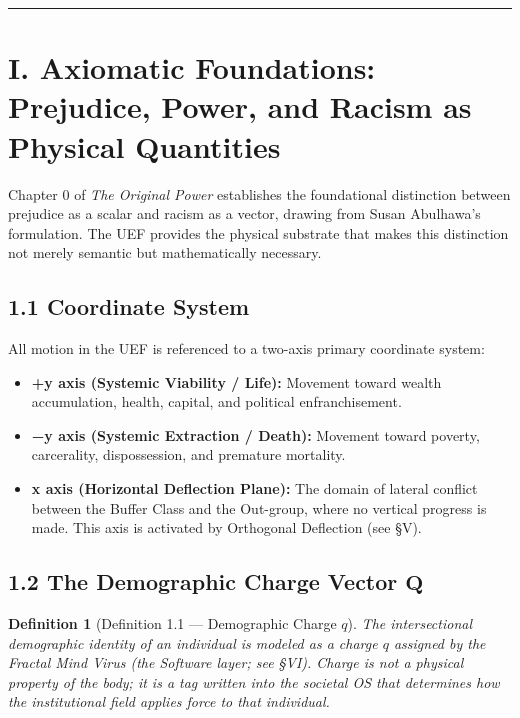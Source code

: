 \documentclass[12pt]{book}
\numberwithin{equation}{chapter}
\newtheorem{definition}{Definition}[chapter]
\begin{document}
\bigskip
\hrule
\bigskip

\section{I. Axiomatic Foundations: Prejudice, Power, and Racism as Physical Quantities}

    Chapter 0 of \emph{The Original Power} establishes the foundational distinction between prejudice as a scalar and racism as a vector, drawing from Susan Abulhawa's formulation. The UEF provides the physical substrate that makes this distinction not merely semantic but mathematically necessary.
  

\subsection{1.1 Coordinate System}

    All motion in the UEF is referenced to a two-axis primary coordinate system:
  

\begin{itemize}

\item \textbf{+y axis (Systemic Viability / Life):} Movement toward wealth accumulation, health, capital, and political enfranchisement.

\item \textbf{−y axis (Systemic Extraction / Death):} Movement toward poverty, carcerality, dispossession, and premature mortality.

\item \textbf{x axis (Horizontal Deflection Plane):} The domain of lateral conflict between the Buffer Class and the Out-group, where no vertical progress is made. This axis is activated by Orthogonal Deflection (see §V).

\end{itemize}

\subsection{1.2 The Demographic Charge Vector $\mathbf{Q}$}

\begin{definition}[Definition 1.1 — Demographic Charge $q$]
The intersectional demographic identity of an individual is modeled as a charge $q$ assigned by the Fractal Mind Virus (the Software layer; see §VI). Charge is not a physical property of the body; it is a tag written into the societal OS that determines how the institutional field applies force to that individual.
    \
\end{definition}
\end{document}
